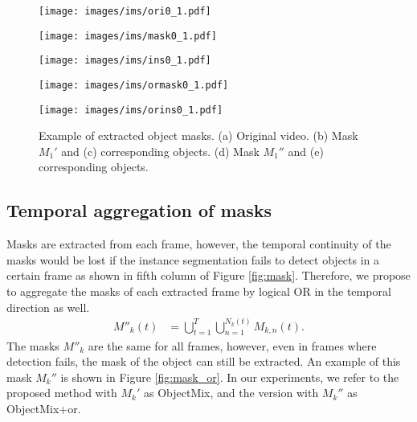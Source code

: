 \begin{figure}[t]
    \centering
    
    \begin{minipage}[t]{0.9\linewidth}
    \centering
    \texttt{[image: images/ims/ori0\_1.pdf]}
    \subcaption{}
    \label{fig:mask_base}
    \end{minipage}
    \vspace{0.5em}

    \begin{minipage}[t]{0.9\linewidth}
    \centering
    \texttt{[image: images/ims/mask0\_1.pdf]}
    \subcaption{}
    \label{fig:mask}
    \end{minipage}
    \vspace{0.5em}
    
    \begin{minipage}[t]{0.9\linewidth}
    \centering
    \texttt{[image: images/ims/ins0\_1.pdf]}
    \subcaption{}
    \label{fig:ins}
    \end{minipage}
    \vspace{0.5em}
    
    \begin{minipage}[t]{00.9\linewidth}
    \centering
    \texttt{[image: images/ims/ormask0\_1.pdf]}
    \subcaption{}
    \label{fig:mask_or}
    \end{minipage}
    \vspace{0.5em}
    
    \begin{minipage}[t]{0.9\linewidth}
    \centering
    \texttt{[image: images/ims/orins0\_1.pdf]}
    \subcaption{}
    \label{fig:ins_or}
    \end{minipage}

    \caption{
    Example of extracted object masks.
    (a) Original video.
    (b) Mask $M_1'$ and
    (c) corresponding objects.
    (d) Mask $M_1''$ and
    (e) corresponding objects.
    }

    \label{fig:mask_example}
\end{figure}



\subsection{Temporal aggregation of masks}

Masks are extracted from each frame, however,
the temporal continuity of the masks would be lost
if the instance segmentation fails to detect objects in a certain frame
as shown in fifth column of Figure \ref{fig:mask}.
Therefore,
we propose to aggregate the masks of each extracted frame by logical OR in the temporal direction as well.
\begin{align}
    M''_k(t) &= \bigcup_{t=1}^{T} \bigcup_{n=1}^{N_k(t)} M_{k,n}(t).
\end{align}
The masks $M''_k$ are the same for all frames,
however, even in frames where detection fails, the mask of the object can still be extracted.
An example of this mask $M_k''$ is shown in Figure \ref{fig:mask_or}.
In our experiments, we refer to the proposed method with $M_k'$ as ObjectMix,
and the version with $M_k''$ as ObjectMix+or.



